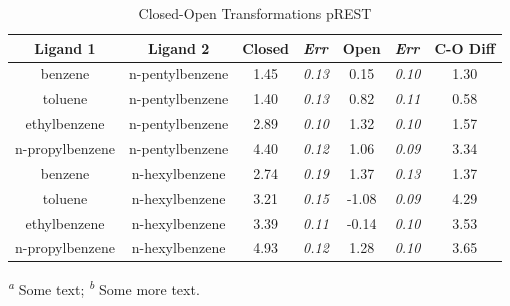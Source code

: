 \documentclass[journal=jctcce,manuscript=article]{achemso}
\begin{document}
\begin{table}[!htb]
\centering
\caption{Closed-Open Transformations pREST}
\label{tbl:C-O_pREST}
\begin{tabular}{|c|c|c|l|c|l|c|}
\hline
\textbf{Ligand 1}                       & \textbf{Ligand 2}                       & {\color[HTML]{800080} \textbf{Closed}} & {\color[HTML]{800080} \textit{Err}} & {\color[HTML]{008000} \textbf{Open}} & {\color[HTML]{008000} \textit{Err}} & \textbf{C-O Diff}            \\ \hline
\cellcolor[HTML]{800080}benzene         & \cellcolor[HTML]{008000}n-pentylbenzene & 1.45                                   & \textit{0.13}                       & 0.15                                & \textit{0.10}                       & \cellcolor[HTML]{FFCCC9}1.30 \\ \hline
\cellcolor[HTML]{800080}toluene         & \cellcolor[HTML]{008000}n-pentylbenzene & 1.40                                   & \textit{0.13}                       & 0.82                                 & \textit{0.11}                       & \cellcolor[HTML]{FFCCC9}0.58 \\ \hline
\cellcolor[HTML]{800080}ethylbenzene    & \cellcolor[HTML]{008000}n-pentylbenzene & 2.89                                   & \textit{0.10}                       & 1.32                                 & \textit{0.10}                       & \cellcolor[HTML]{FFCCC9}1.57 \\ \hline
\cellcolor[HTML]{800080}n-propylbenzene & \cellcolor[HTML]{008000}n-pentylbenzene & 4.40                                   & \textit{0.12}                       & 1.06                                & \textit{0.09}                       & \cellcolor[HTML]{FFCCC9}3.34 \\ \hline
\cellcolor[HTML]{800080}benzene         & \cellcolor[HTML]{008000}n-hexylbenzene  & 2.74                                   & \textit{0.19}                       & 1.37                                & \textit{0.13}                       & \cellcolor[HTML]{FFCCC9}1.37 \\ \hline
\cellcolor[HTML]{800080}toluene         & \cellcolor[HTML]{008000}n-hexylbenzene  & 3.21                                   & \textit{0.15}                       & -1.08                                & \textit{0.09}                       & \cellcolor[HTML]{FFCCC9}4.29 \\ \hline
\cellcolor[HTML]{800080}ethylbenzene    & \cellcolor[HTML]{008000}n-hexylbenzene  & 3.39                                   & \textit{0.11}                       & -0.14                                & \textit{0.10}                       & \cellcolor[HTML]{FFCCC9}3.53 \\ \hline
\cellcolor[HTML]{800080}n-propylbenzene & \cellcolor[HTML]{008000}n-hexylbenzene  & 4.93                                   & \textit{0.12}                       & 1.28                                 & \textit{0.10}                       & \cellcolor[HTML]{FFCCC9}3.65 \\ \hline
\end{tabular}

  \textsuperscript{\emph{a}} Some text;
  \textsuperscript{\emph{b}} Some more text.
\end{table}
\end{document}
